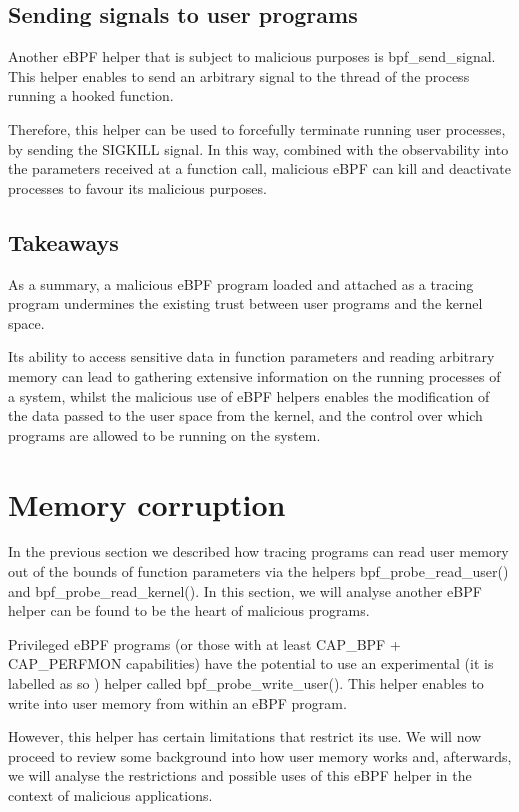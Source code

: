 \subsection{Sending signals to user programs}
Another eBPF helper that is subject to malicious purposes is bpf\_send\_signal. This helper enables to send an arbitrary signal to the thread of the process running a hooked function.

Therefore, this helper can be used to forcefully terminate running user processes, by sending the SIGKILL signal. In this way, combined with the observability into the parameters received at a function call, malicious eBPF can kill and deactivate processes to favour its malicious purposes.

\subsection{Takeaways} \label{subsection:tracing_attacks_conclusion}
As a summary, a malicious eBPF program loaded and attached as a tracing program undermines the existing trust between user programs and the kernel space. 

Its ability to access sensitive data in function parameters and reading arbitrary memory can lead to gathering extensive information on the running processes of a system, whilst the malicious use of eBPF helpers enables the modification of the data passed to the user space from the kernel, and the control over which programs are allowed to be running on the system.

\section{Memory corruption} \label{section:mem_corruption}
In the previous section we described how tracing programs can read user memory out of the bounds of function parameters via the helpers bpf\_probe\_read\_user() and bpf\_probe\_read\_kernel(). In this section, we will analyse another eBPF helper can be found to be the heart of malicious programs.

Privileged eBPF programs (or those with at least CAP\_BPF + CAP\_PERFMON capabilities) have the potential to use an experimental (it is labelled as so \cite{ebpf_helpers}) helper called bpf\_probe\_write\_user(). This helper enables to write into user memory from within an eBPF program. 

However, this helper has certain limitations that restrict its use. We will now proceed to review some background into how user memory works and, afterwards, we will analyse the restrictions and possible uses of this eBPF helper in the context of malicious applications.



